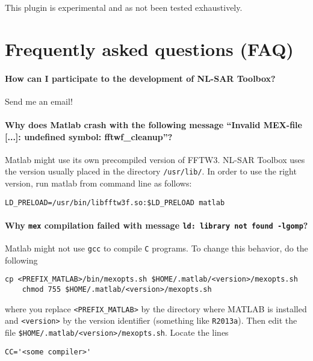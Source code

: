 \documentclass[10pt,french,english,a4paper]{article}
\begin{document}
This plugin is experimental and as not been tested exhaustively.

\section{Frequently asked questions (FAQ)}

\paragraph{\bf How can I participate to the development of NL-SAR Toolbox?}

Send me an email!

\paragraph{\bf Why does Matlab crash with the following message ``Invalid MEX-file [...]: undefined symbol: fftwf\_cleanup''?}

Matlab might use its own precompiled version of FFTW3. NL-SAR Toolbox uses the version
usually placed in the directory \texttt{/usr/lib/}. In order to use the right version,
run matlab from command line as follows:

  \begin{Verbatim}[frame=single]
    LD_PRELOAD=/usr/bin/libfftw3f.so:$LD_PRELOAD matlab
  \end{Verbatim}


\paragraph{\bf Why \texttt{mex} compilation failed with message \texttt{ld: library not found -lgomp}?}

Matlab might not use \texttt{gcc} to compile \texttt{C} programs.
To change this behavior, do the following

  \begin{Verbatim}[frame=single]
    cp <PREFIX_MATLAB>/bin/mexopts.sh $HOME/.matlab/<version>/mexopts.sh
    chmod 755 $HOME/.matlab/<version>/mexopts.sh
  \end{Verbatim}

where you replace \texttt{<PREFIX\_MATLAB>} by the directory where MATLAB is installed
and \texttt{<version>} by the version identifier (something like \texttt{R2013a}).
Then edit the file \texttt{\$HOME/.matlab/<version>/mexopts.sh}. Locate the lines

  \begin{Verbatim}[frame=single]
    CC='<some compiler>'
  \end{Verbatim}
\end{document}
